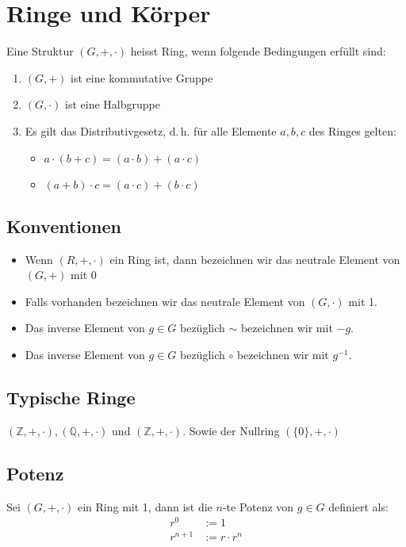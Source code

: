 \section{Ringe und Körper}
Eine Struktur $(G, +, \cdot)$  heisst Ring, wenn folgende Bedingungen erfüllt sind:
\begin{enumerate}
	\item $(G, +)$ ist eine kommutative Gruppe
	\item $(G, \cdot)$ ist eine Halbgruppe
	\item Es gilt das Distributivgesetz, d.\,h. für alle Elemente $a, b, c$ des Ringes gelten:
	\begin{itemize}
		\item $a \cdot (b + c) = (a \cdot b) + (a \cdot c)$
		\item $(a + b) \cdot c = (a \cdot c) + (b \cdot c)$
	\end{itemize}
\end{enumerate}

\subsection{Konventionen}
\begin{itemize}
	\item Wenn $(R, +, \cdot)$ ein Ring ist, dann bezeichnen wir das neutrale Element von $(G, +)$ mit 0
	\item Falls vorhanden bezeichnen wir das neutrale Element von $(G, \cdot)$ mit 1.
	\item Das inverse Element von $g \in G$ bezüglich $\sim$ bezeichnen wir mit $-g$.
	\item Das inverse Element von $g \in G$ bezüglich $\circ$ bezeichnen wir mit $g^{-1}$.
\end{itemize}

\subsection{Typische Ringe}
$(\mathbb{Z}, +, \cdot), (\mathbb{Q}, +, \cdot)$ und $(\mathbb{Z}, +, \cdot)$. Sowie der Nullring $(\{0\}, +, \cdot)$

\subsection{Potenz}
Sei $(G, +, \cdot)$ ein Ring mit 1, dann ist die $n$-te Potenz von $g \in G$ definiert als:
\begin{align*}
	r^0& := 1\\
	r^{n + 1}& := r \cdot r^n
\end{align*}

